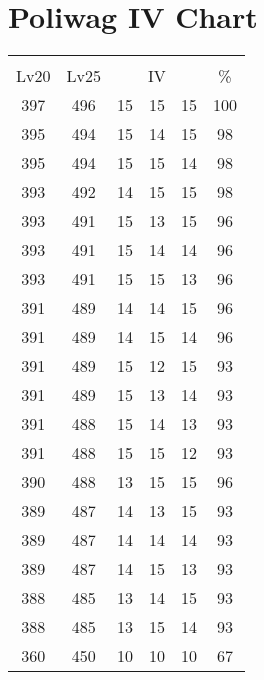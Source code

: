 \documentclass{article}%
\begin{document}
%
\normalsize%
\section{Poliwag IV Chart}%
\label{sec:Poliwag IV Chart}%
\renewcommand{\arraystretch}{1.5}%
\begin{tabular}{|c|c|c|c|c|c|}%
\hline%
\multicolumn{6}{|c|}{\textcolor{white}{ 
\linebreak{Poliwag}
}%
\cellcolor{black}}\\%
\multicolumn{1}{|c}{Lv20}&\multicolumn{1}{c|}{Lv25}&\multicolumn{3}{c|}{IV}&\multicolumn{1}{|c|}{\%}\\%
\hline%
\rowcolor{color100}%
397&496&15&15&15&100\\%
\hline%
\rowcolor{color98}%
395&494&15&14&15&98\\%
\hline%
\rowcolor{color98}%
395&494&15&15&14&98\\%
\hline%
\rowcolor{color98}%
393&492&14&15&15&98\\%
\hline%
\rowcolor{color96}%
393&491&15&13&15&96\\%
\hline%
\rowcolor{color96}%
393&491&15&14&14&96\\%
\hline%
\rowcolor{color96}%
393&491&15&15&13&96\\%
\hline%
\rowcolor{color96}%
391&489&14&14&15&96\\%
\hline%
\rowcolor{color96}%
391&489&14&15&14&96\\%
\hline%
\rowcolor{color93}%
391&489&15&12&15&93\\%
\hline%
\rowcolor{color93}%
391&489&15&13&14&93\\%
\hline%
\rowcolor{color93}%
391&488&15&14&13&93\\%
\hline%
\rowcolor{color93}%
391&488&15&15&12&93\\%
\hline%
\rowcolor{color96}%
390&488&13&15&15&96\\%
\hline%
\rowcolor{color93}%
389&487&14&13&15&93\\%
\hline%
\rowcolor{color93}%
389&487&14&14&14&93\\%
\hline%
\rowcolor{color93}%
389&487&14&15&13&93\\%
\hline%
\rowcolor{color93}%
388&485&13&14&15&93\\%
\hline%
\rowcolor{color93}%
388&485&13&15&14&93\\%
\hline%
\rowcolor{color91}%
360&450&10&10&10&67\\%
\end{tabular}

%
\end{document}
